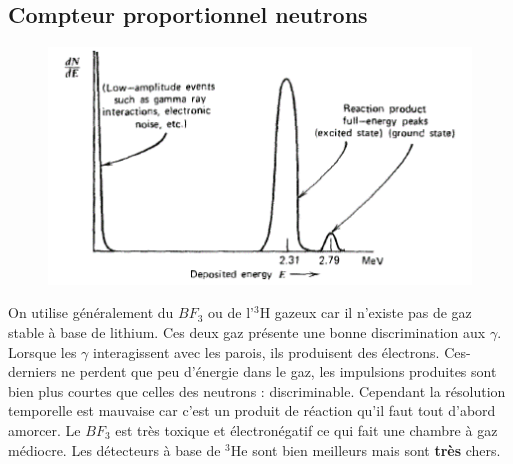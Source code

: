 \subsection{Compteur proportionnel neutrons}%
	\begin{figure}
	\vspace{-5mm}
	\includegraphics[scale=0.65]{ch11/image1}
	\end{figure}
On utilise généralement du $BF_3$ ou de l'$^3$H gazeux car il n'existe pas de gaz stable à 
base de lithium. Ces deux gaz présente une bonne discrimination aux $\gamma$. Lorsque les
$\gamma$ interagissent avec les parois, ils produisent des électrons. Ces-derniers ne perdent
que peu d'énergie dans le gaz, les impulsions produites sont bien plus courtes que celles des 
neutrons : discriminable. Cependant la résolution temporelle est mauvaise car c'est un produit
de réaction qu'il faut tout d'abord amorcer. Le $BF_3$ est très toxique et électronégatif ce qui
fait une chambre à gaz médiocre. Les détecteurs à base de $^3$He sont bien meilleurs mais
sont \textbf{très} chers.\\

